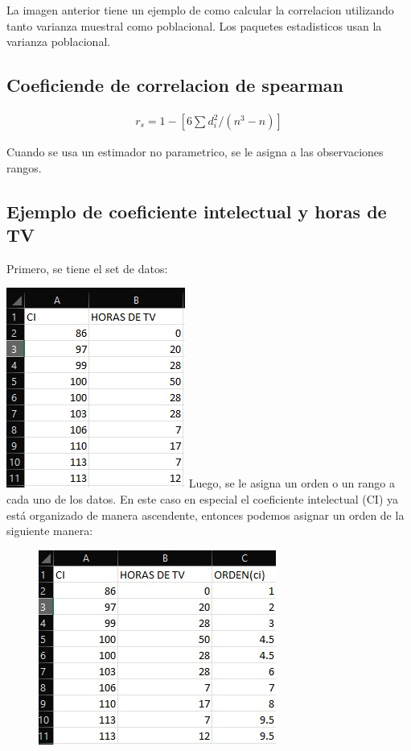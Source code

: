 \documentclass[twocolumn]{article}
\begin{document}
La imagen anterior tiene un ejemplo de como calcular la correlacion
utilizando tanto varianza muestral como poblacional. Los paquetes
estadisticos usan la varianza poblacional.

\subsection{Coeficiende de correlacion de
spearman}\label{coeficiende-de-correlacion-de-spearman}

\[
\begin{array}{c}
r_s = 1 - [6 \sum d_i^2 / (n^3-n) ] 
\end{array}
\]

Cuando se usa un estimador no parametrico, se le asigna a las
observaciones rangos.

\subsection{Ejemplo de coeficiente intelectual y horas de
TV}\label{ejemplo-de-coeficiente-intelectual-y-horas-de-tv}

Primero, se tiene el set de datos:

\includegraphics{./img/CI1.jpg} Luego, se le asigna un orden o un rango
a cada uno de los datos. En este caso en especial el coeficiente
intelectual (CI) ya está organizado de manera ascendente, entonces
podemos asignar un orden de la siguiente manera:

\begin{figure}
\centering
\includegraphics{./img/CI2.jpg}
\caption{}
\end{figure}
\end{document}
